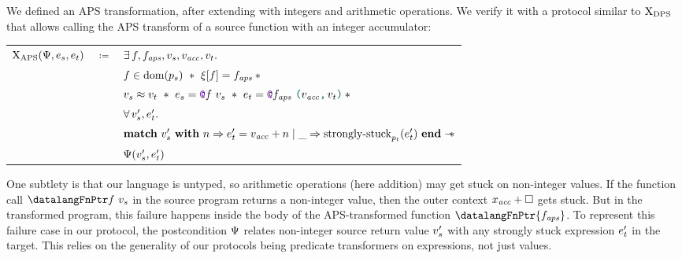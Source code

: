 We defined an APS transformation, after extending \DataLang with integers and arithmetic operations. We verify it with a protocol similar to $\mathrm{X}_\mathrm{DPS}$ that allows calling the APS transform of a source function with an integer accumulator:

\medskip
\begin{tabular}{rcl}
        $\iProt_\mathrm{APS} (\iPredTwo, \datalangExpr_s, \datalangExpr_t)$
        & $\coloneqq$ &
        $\exists \datalangFn, \datalangFn_\mathit{aps}, \datalangVal_s, \datalangVal_\mathit{acc}, \datalangVal_t \ldotp$
    \\
        &&
        $\datalangFn \in \dom{\datalangProg_s}
        \ \iSep\ %
        \datalangRenaming [\datalangFn] = \datalangFn_\mathit{aps}
        \iSep {}$
    \\
        &&
        $\datalangVal_s \iSimilar \datalangVal_t
        \ \iSep\ %
        \datalangExpr_s = \datalangCall{\datalangFnptr{\datalangFn}}{\datalangVal_s}
        \ \iSep\ %
        \datalangExpr_t = \datalangCall{\datalangFnptr{\datalangFn_\mathit{aps}}}{\datalangPair{\datalangVal_\mathit{acc}}{\datalangVal_t}}
        \iSep {}$
    \\
        &&
        $\forall \datalangVal_s', \datalangExpr_t' \ldotp$
    \\
        &&
        $\bm{\mathrm{match}}\ \datalangVal_s'\ \bm{\mathrm{with}}\ \datalangNat \Rightarrow \datalangExpr_t' = \datalangVal_\mathit{acc} + \datalangNat \mid \_ \Rightarrow \mathrm{strongly \mathhyphen stuck}_{\datalangProg_t} (\datalangExpr_t')\ \bm{\mathrm{end}} \iWand$
    \\
        &&
        $\iPredTwo (\datalangVal_s', \datalangExpr_t')$
\end{tabular}
\medskip

One subtlety is that our \DataLang language is untyped, so arithmetic operations (here addition) may get stuck on non-integer values. If the function call $\datalangCall {\datalangFnPtr \datalangFn} {\datalangVal_s}$ in the source program returns a non-integer value, then the outer context $\datalangVar_\mathit{acc} + \datalangCtxHole$ gets stuck. But in the transformed program, this failure happens inside the body of the APS-transformed function $\datalangFnPtr {\datalangFn_\mathit{aps}}$. To represent this failure case in our protocol, the postcondition $\Psi$ relates non-integer source return value $\datalangVal_s'$ with any strongly stuck expression $\datalangExpr_t'$ in the target. This relies on the generality of our protocols being predicate transformers on expressions, not just values.


